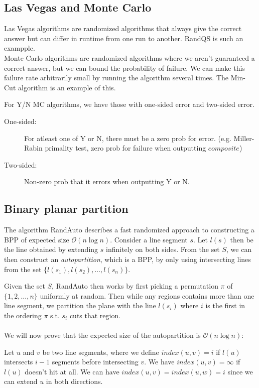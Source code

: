 \documentclass[a4paper]{article}
\begin{document}
\subsection{Las Vegas and Monte Carlo}
Las Vegas algorithms are randomized algorithms that always give the correct answer but can differ in runtime from one run to another. RandQS is such an exampple.\\

Monte Carlo algorithms are randomized algorithms where we aren't guaranteed a correct answer, but we can bound the probability of failure. We can make this failure rate arbitrarily small by running the algorithm several times. The Min-Cut algorithm is an example of this.

For Y/N MC algorithms, we have those with one-sided error and two-sided error.
\begin{description}
  \item[One-sided:] For atleast one of Y or N, there must be a zero prob for error. (e.g. Miller-Rabin primality test, zero prob for failure when outputting $composite$)
  \item[Two-sided:] Non-zero prob that it errors when outputting Y or N.
\end{description}
\subsection{Binary planar partition}
The algorithm RandAuto describes a fast randomized approach to constructing a BPP of expected size $\mathcal{O}(n\log n)$. Consider a line segment $s$. Let $l(s)$ then be the line obtained by extending $s$ infinitely on both sides. From the set $S$, we can then construct an \textit{autopartition}, which is a BPP, by only using intersecting lines from the set $\{l(s_1), l(s_2),\ldots,l(s_n)\}$.

Given the set $S$, RandAuto then works by first picking a permutation $\pi$ of $\{1,2,\ldots,n\}$ uniformly at random. Then while any regions contains more than one line segment, we partition the plane with the line $l(s_i)$ where $i$ is the first in the ordering $\pi$ s.t. $s_i$ cuts that region.\\
\\
We will now prove that the expected size of the autopartition is $\mathcal{O}(n\log n)$:

Let $u$ and $v$ be two line segments, where we define $index(u,v)=i$ if $l(u)$ intersects $i-1$ segments before intersecting $v$. We have $index(u,v)=\infty$ if $l(u)$ doesn't hit at all. We can have $index(u,v)=index(u,w)=i$ since we can extend $u$ in both directions.
\end{document}
